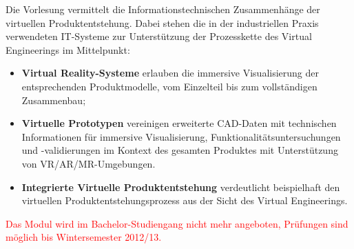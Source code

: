 \begin{module}
\begin{content}
Die Vorlesung vermittelt die Informationstechnischen Zusammenhänge der virtuellen Produktentstehung. Dabei stehen die in der industriellen Praxis verwendeten IT-Systeme zur Unterstützung der Prozesskette des Virtual Engineerings im Mittelpunkt:

 \begin{itemize}\item \textbf{Virtual Reality-Systeme} erlauben die immersive Visualisierung der entsprechenden Produktmodelle, vom Einzelteil bis zum vollständigen Zusammenbau;   \item \textbf{Virtuelle Prototypen} vereinigen erweiterte CAD-Daten mit technischen Informationen für immersive Visualisierung, Funktionalitätsuntersuchungen und -validierungen im Kontext des gesamten Produktes mit Unterstützung von VR/AR/MR-Umgebungen.  \item \textbf{Integrierte Virtuelle Produktentstehung} verdeutlicht beispielhaft den virtuellen Produktentstehungsprozess aus der Sicht des Virtual Engineerings.  \end{itemize}
\end{content}

\begin{remarks}\textcolor{red}{Das Modul wird im Bachelor-Studiengang nicht mehr angeboten, Prüfungen sind möglich bis Wintersemester 2012/13.}

\end{remarks}

\end{module}

